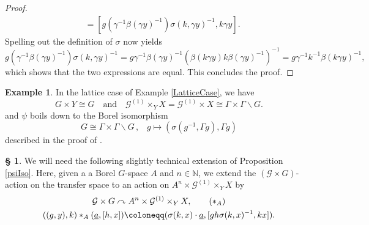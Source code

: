 \documentclass[11pt, oneside]{amsart}
\theoremstyle{definition}
\newtheorem{example}[lemma]{Example}
\newtheorem{no}[lemma]{\S}
\theoremstyle{remark}
\theoremstyle{TheoremNum}
\newcommand{\cG}{\mathcal{G}}
\newcommand{\qand}{\quad \text{and} \quad}
\newcommand{\bN}{\mathbb N}
\begin{document}
\begin{proof}
\begin{align*}
   &=[g(\gamma^{-1}\beta(\gamma y)^{-1})\sigma(k,\gamma y)^{-1},k\gamma y].
\end{align*}
Spelling out the definition of $\sigma$ now yields
\[
g(\gamma^{-1}\beta(\gamma y)^{-1})\sigma(k,\gamma y)^{-1} = g\gamma^{-1}\beta(\gamma y)^{-1}(\beta(k \gamma y)k \beta(\gamma y)^{-1})^{-1}
= g \gamma^{-1}k^{-1}\beta(k\gamma y)^{-1},
\]
which shows that the two expressions are equal. This concludes the proof.
\end{proof}
\begin{example}
  In the lattice case of Example \ref{LatticeCase}, we have
\[
G \times Y \cong G \qand  \mathcal{G}^{(1)} \times_Y X = \mathcal{G}^{(1)} \times X \cong \Gamma \times \Gamma \backslash G.
\]
and $\psi$ boils down to the Borel isomorphism
$$G\cong\Gamma\times \Gamma\backslash G\,,\;\;\; g\mapsto (\sigma(g^{-1},\Gamma g),\Gamma g)$$
described in  the proof of \cite[Lemma 5.4.3]{monod:libro}. 
\end{example}
\begin{no} We will need the following slightly technical extension of Proposition \ref{psiIso}. Here, given a a Borel $G$-space $A$ and $n \in \bN$, we extend the $(\cG \times G)$-action on the transfer space to an action on $A^n \times \cG^{(1)}\times_Y X$
by
\begin{gather}\label{AstAction}
\cG \times G \curvearrowright A^n \times \cG^{(1)}\times_Y X, \tag{$\ast_A$}\\ ((g,y),k) \ast_A (\underline{a},[h,x])\coloneqq (\sigma(k,x)\cdot \underline{a}, [gh\sigma(k,x)^{-1}, kx]).\notag
\end{gather}
\end{no}
\end{document}
